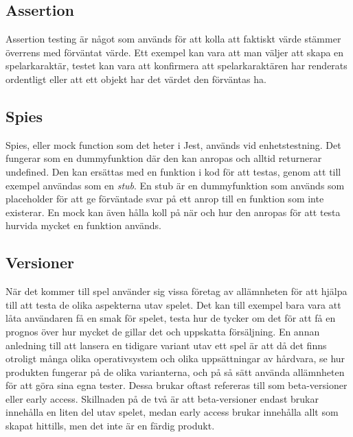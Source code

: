 \subsection{Assertion}
Assertion testing är något som används för att kolla att faktiskt värde stämmer överrens med förväntat värde. Ett exempel kan vara att man väljer att skapa en spelarkaraktär, testet kan vara att konfirmera att spelarkaraktären har renderats ordentligt eller att ett objekt har det värdet den förväntas ha. 
\subsection{Spies}
Spies, eller mock function\cite{bib-mock} som det heter i Jest, används vid enhetstestning. Det fungerar som en dummyfunktion där den kan anropas och alltid returnerar undefined. Den kan ersättas med en funktion i kod för att testas, genom att till exempel användas som en \textit{stub}. En stub är en dummyfunktion som används som placeholder för att ge förväntade svar på ett anrop till en funktion som inte existerar. En mock kan även hålla koll på när och hur den anropas för att testa hurvida mycket en funktion används.
\subsection{Versioner}
När det kommer till spel använder sig vissa företag av allämnheten för att hjälpa till att testa de olika aspekterna utav spelet. Det kan till exempel bara vara att låta användaren få en smak för spelet, testa hur de tycker om det för att få en prognos över hur mycket de gillar det och uppskatta försäljning. En annan anledning till att lansera en tidigare variant utav ett spel är att då det finns otroligt många olika operativsystem och olika uppsättningar av hårdvara, se hur produkten fungerar på de olika varianterna, och på så sätt använda allämnheten för att göra sina egna tester. Dessa brukar oftast refereras till som beta-versioner eller early access\cite{bib-beta-version}. Skillnaden på de två är att beta-versioner endast brukar innehålla en liten del utav spelet, medan early access brukar innehålla allt som skapat hittills, men det inte är en färdig produkt.
